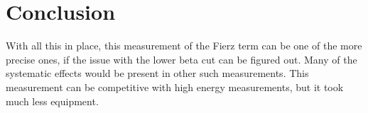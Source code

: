 \documentclass[../MaxHughesThesis.tex]{subfiles}
\begin{document}
\section{Conclusion}
With all this in place, this measurement of the Fierz term can be one of the more precise ones, if the issue with the lower beta cut can be figured out.
Many of the systematic effects would be present in other such measurements.
This measurement can be competitive with high energy measurements, but it took much less equipment.
\end{document}
